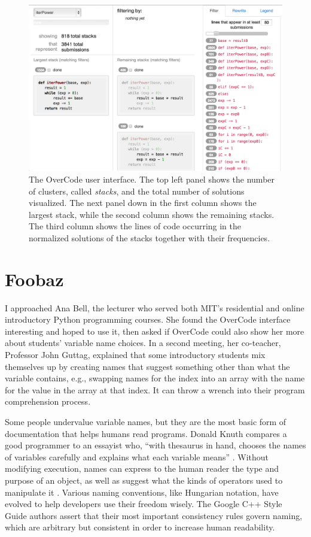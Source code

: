 \begin{figure}
\centering
\includegraphics[width=1.0\linewidth]{Body/figures/interfaceScreenShot.png}
\caption{The OverCode user interface. The top left panel shows the number of clusters, called {\it stacks}, and the total number of solutions visualized. The next panel down in the first column shows the largest stack, while the second column shows the remaining stacks. The third column shows the lines of code occurring in the normalized solutions of the stacks together with their frequencies.}
\label{fullinterface}
\end{figure}


\section{Foobaz}

I approached Ana Bell, the lecturer who served both MIT's residential and online introductory Python programming courses. She found the OverCode interface interesting and hoped to use it, then asked if OverCode could also show her more about students' variable name choices. In a second meeting, her co-teacher, Professor John Guttag, explained that some introductory students mix themselves up by creating names that suggest something other than what the variable contains, e.g., swapping names for the index into an array with the name for the value in the array at that index. It can throw a wrench into their program comprehension process.

Some people undervalue variable names, but they are the most basic form of documentation that helps humans read programs. Donald Knuth compares a good programmer to an essayist who, ``with thesaurus in hand, chooses the names of variables carefully and explains what each variable means'' \cite{literateprogramming}. Without modifying execution, names can express to the human reader the type and purpose of an object, as well as suggest what the kinds of operators used to manipulate it \cite{operands}. Various naming conventions, like Hungarian notation, have evolved to help developers use their freedom wisely. The Google C++ Style Guide authors assert that their most important consistency rules govern naming, which are arbitrary but consistent in order to increase human readability. 

